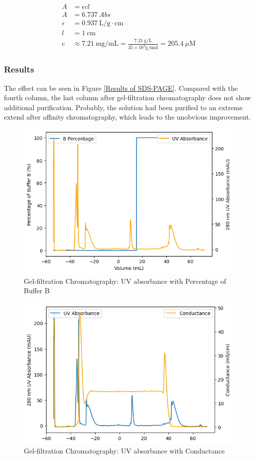 \documentclass{report}
\begin{document}
\begin{align}
    A &= \epsilon cl \\
    A &= 6.737\ Abs \\
    \epsilon &= 0.937\ \text{L/g}\cdot\text{cm} \\
    l &= 1\ \text{cm}\\
    c &\approx 7.21\ \text{mg/mL}=\frac{7.21\ \text{g/L}}{35\times 10^3 \text{g/mol}}=205.4\ \mu\text{M}    
\end{align}

\subsubsection{Results}
The effect can be seen in Figure \ref{Results of SDS-PAGE}.
Compared with the fourth column, the last column after gel-filtration chromatography does not show additional purification.
Probably, the solution had been purified to an extreme extend after affinity chromatography, which leads to the unobvious improvement.

\begin{figure}
    \centering
    \includegraphics[width=0.6\linewidth]{../Figures/Filtration Column UV.png}
    \caption{Gel-filtration Chromatography: UV absorbance with Percentage of Buffer B}
    \label{Gel-filtration Chromatography: UV absorbance with Percentage of Buffer B}
\end{figure}

\begin{figure}
    \centering
    \includegraphics[width=0.6\linewidth]{../Figures/Filtration Column UV and Conductance.png}
    \caption{Gel-filtration Chromatography: UV absorbance with Conductance}
    \label{Gel-filtration Chromatography: UV absorbance with Conductace}
\end{figure}
\end{document}
